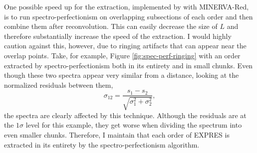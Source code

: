 One possible speed up for the extraction, implemented by \citet{cornachione_full_2019} with MINERVA-Red, is to run spectro-perfectionism on overlapping subsections of each order and then combine them after reconvolution. This can easily decrease the size of $L$ and therefore substantially increase the speed of the extraction. I would highly caution against this, however, due to ringing artifacts that can appear near the overlap points. Take, for example, Figure \ref{fig:spec-perf-ringing} with an order extracted by spectro-perfectionism both in its entirety and in small chunks. Even though these two spectra appear very similar from a distance, looking at the normalized residuals between them,
\begin{equation}
    \sigma_{12} = \frac{s_1 - s_2}{\sqrt{\sigma_1^2 + \sigma_2^2}},
    \label{eq:residual}
\end{equation}
the spectra are clearly affected by this technique. Although the residuals are at the $1\sigma$ level for this example, they get worse when dividing the spectrum into even smaller chunks. Therefore, I maintain that each order of EXPRES is extracted in its entirety by the spectro-perfectionism algorithm.


